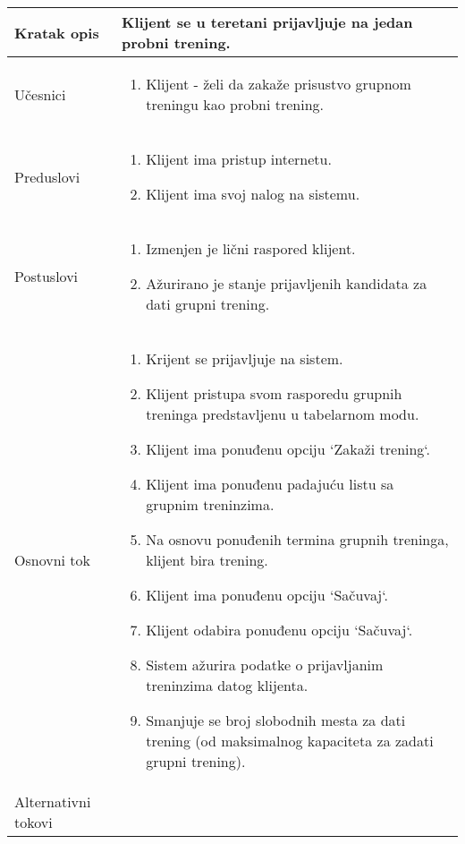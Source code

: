 \documentclass[../grupniTreninzi.tex]{subfiles}
\begin{document}
\begin{longtable}{| p{} | p{} |} 
\hline
    Kratak opis &  Klijent se u teretani prijavljuje na jedan probni trening.\\ 
\hline    
    Učesnici &
    \begin{enumerate}
        \item Klijent - želi da zakaže prisustvo grupnom treningu kao probni trening.
    \end{enumerate}\\
\hline
   Preduslovi & 
   \begin{enumerate}
        \item Klijent ima pristup internetu.
        \item Klijent ima svoj nalog na sistemu.
    \end{enumerate}\\
\hline  
    Postuslovi &
    \begin{enumerate}
        \item Izmenjen je lični raspored klijent.
        \item Ažurirano je stanje prijavljenih kandidata za dati grupni trening.
    \end{enumerate}\\
\hline
    Osnovni tok & 
    \begin{enumerate}
        \item Krijent se prijavljuje na sistem.
        \item Klijent pristupa svom rasporedu grupnih treninga predstavljenu u tabelarnom modu.
        \item Klijent ima ponuđenu opciju `Zakaži trening`.
        \item Klijent ima ponuđenu padajuću listu sa grupnim treninzima.
        \item Na osnovu ponuđenih termina grupnih treninga, klijent bira trening.
        \item Klijent ima ponuđenu opciju `Sačuvaj`.
        \item Klijent odabira ponuđenu opciju `Sačuvaj`.
        \item Sistem ažurira podatke o prijavljanim treninzima datog klijenta.
        \item Smanjuje se broj slobodnih mesta za dati trening (od maksimalnog kapaciteta za zadati grupni trening).
    \end{enumerate}\\
\hline
    Alternativni tokovi & 
       \begin{enumerate}

\end{enumerate}
\end{longtable}
\end{document}
